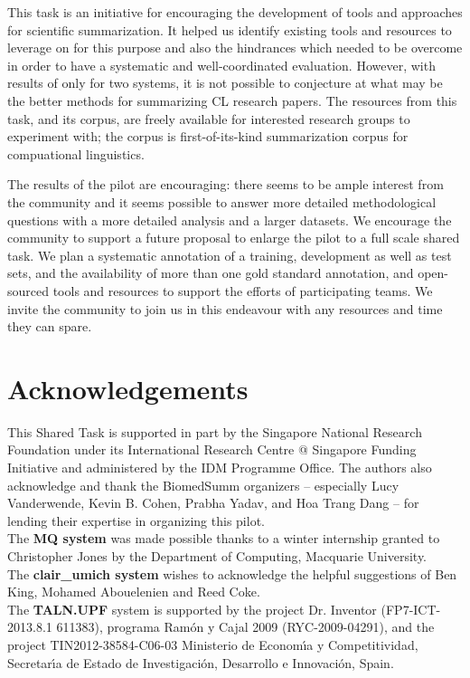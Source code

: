 \documentclass[11pt]{article}
\begin{document}
This task is an initiative for encouraging the development of tools and 
approaches for scientific summarization. It helped us identify 
existing tools and resources to leverage on for this purpose
and also the hindrances which needed to be overcome in order to have a 
systematic and well-coordinated evaluation. However, with results of 
only for two systems, it is not possible to conjecture at what may be the 
better methods for summarizing CL research papers. The 
resources from this task, and its corpus, are freely available 
for interested research groups to experiment with; the corpus is 
first-of-its-kind summarization corpus for compuational linguistics.

The results of the pilot are encouraging: there seems to be ample
interest from the community and it seems possible to answer more
detailed methodological questions with a more detailed analysis and a
larger datasets.  We encourage the community to support a future
proposal to enlarge the pilot to a full scale shared task.  We plan a
systematic annotation of a training, development as well as test sets,
and the availability of more than one gold standard annotation, and
open-sourced tools and resources to support the efforts of
participating teams. We invite the community to join us in this
endeavour with any resources and time they can spare.



\section{Acknowledgements}
 This Shared Task is supported in part by the Singapore National
 Research Foundation under its International Research Centre @
 Singapore Funding Initiative and administered by the IDM Programme
 Office.  The authors also acknowledge and thank the BiomedSumm
 organizers -- especially Lucy Vanderwende, Kevin B. Cohen, Prabha
 Yadav, and Hoa Trang Dang -- for lending their expertise in
 organizing this pilot.\\ The {\bf MQ system} was made possible thanks
 to a winter internship granted to Christopher Jones by the Department
 of Computing, Macquarie University. \\ The {\bf clair\_umich system}
 wishes to acknowledge the helpful suggestions of Ben King, Mohamed
 Abouelenien and Reed Coke. \\ The {\bf TALN.UPF} system is supported
 by the project Dr. Inventor (FP7-ICT-2013.8.1 611383), programa
 Ram\'on y Cajal 2009 (RYC-2009-04291), and the project
 TIN2012-38584-C06-03 Ministerio de Econom\'{\i}a y Competitividad,
 Secretar\'{\i}a de Estado de Investigaci\'on, Desarrollo e
 Innovaci\'on, Spain.


\end{document}
